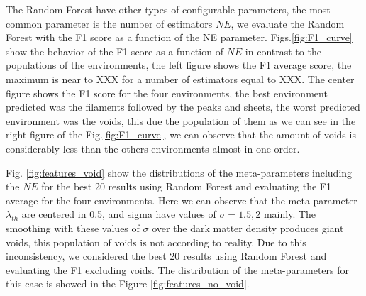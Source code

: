 \documentclass[usenatbib]{mnras}
\begin{document}
The Random Forest have other types of configurable parameters, the most common parameter is the number of estimators $NE$, we evaluate the Random Forest with the F1 score as a function of the NE parameter. 
Figs.\ref{fig:F1_curve} show the behavior of the F1 score as a function of $NE$ in contrast to the populations of the environments,
the left figure shows the F1 average score,
the maximum is near to XXX for a number of estimators equal to XXX.
The center figure shows the F1 score for the four environments,
the best environment predicted was the filaments followed by the peaks and sheets,
the worst predicted environment was the voids,
this due the population of them as we can see in the right figure of the Fig.\ref{fig:F1_curve},
we can observe that the amount of voids is considerably less than the others environments almost in one order.

Fig. \ref{fig:features_void} show the distributions of the meta-parameters including the $NE$ for the best 20 results using Random Forest and evaluating the F1 average for the four environments. Here we can observe that the meta-parameter $\lambda_{th}$ are centered in 0.5, and sigma have values of $\sigma=1.5,2$ mainly. The smoothing with these values of $\sigma$ over the dark matter density produces giant voids, this population of voids is not according to reality. Due to this inconsistency, we considered the best 20 results using Random Forest and evaluating the F1 excluding voids. The distribution of the meta-parameters for this case is showed in the Figure \ref{fig:features_no_void}.
\end{document}
